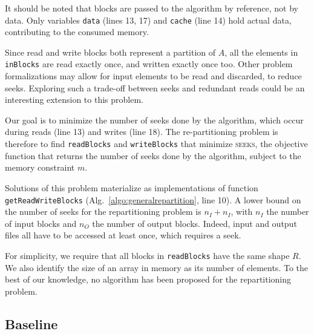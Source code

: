 \documentclass[sigconf, nonacm]{acmart}
\newcommand{\tristan}[1]{\color{orange}\textbf{From Tristan:}#1\color{black}}
\begin{document}
It should be noted that blocks are passed to the algorithm by reference,
not by data. Only variables \texttt{data} (lines 13, 17) and \texttt{cache}
(line 14) hold actual data, contributing to the consumed memory. 

Since read and write blocks both represent a partition of $A$, all the
elements in \texttt{inBlocks} are read exactly once, and written exactly once too. Other
problem formalizations may allow for input elements to be read and
discarded, to reduce seeks. Exploring such a trade-off
between seeks and redundant reads could be an interesting extension to this problem.

Our goal is to minimize the number of seeks done by the algorithm, which
occur during reads (line 13) and writes (line 18). The re-partitioning
problem is therefore to find \texttt{readBlocks} and \texttt{writeBlocks} that
minimize \textsc{seeks}, the objective function that returns the number of
seeks done by the algorithm, subject to the memory constraint $m$. 


Solutions of this problem materialize as implementations of function
\texttt{getReadWriteBlocks} (Alg.~\ref{algo:generalrepartition}, line 10). A
lower bound on the number of seeks for the repartitioning problem is $n_I +
n_I$, with $n_I$ the number of input blocks and $n_O$ the number of output
blocks. Indeed, input and output files all have to be accessed at least
once, which requires a seek.

For simplicity, we require that all blocks in \texttt{readBlocks} have the
same shape $R$. We also identify the size of an array in memory as its
number of elements. To the best of our knowledge, no algorithm has been
proposed for the repartitioning problem.


\subsection{Baseline}
\end{document}
